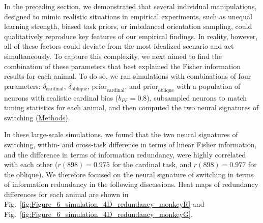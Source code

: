 \documentclass[lineno,pdflatex,sn-basic]{sn-jnl}%
\theoremstyle{thmstyleone}%
\theoremstyle{thmstyletwo}%
\theoremstyle{thmstylethree}%
\begin{document}

In the preceding section, we demonstrated that several individual manipulations, designed to mimic realistic situations in empirical experiments, such as unequal learning strength, biased task priors, or imbalanced orientation sampling, could qualitatively reproduce key features of our empirical findings. In reality, however, all of these factors could deviate from the most idealized scenario and act simultaneously. To capture this complexity, we next aimed to find the combination of these parameters that best explained the Fisher information results for each animal. To do so, we ran simulations with combinations of four parameters: $\delta_\textrm{cardinal}$, $\delta_\textrm{oblique}$, $\textrm{prior}_\textrm{cardinal}$, and $\textrm{prior}_\textrm{oblique}$ with a population of neurons with realistic cardinal bias ($b_{PF} = 0.8$), subsampled neurons to match tuning statistics for each animal, and then computed the two neural signatures of switching
(\hyperref[sec_ch2:nonideal_simulation_largescale]{Methods}). 

In these large-scale simulations, we found that the two neural signatures of switching, within- and cross-task difference in terms of linear Fisher information, and the difference in terms of information redundancy, were highly correlated with each other ($r(898) =  0.975$ for the cardinal task, and $r(898) =  0.977$ for the oblique). We therefore focused on the neural signature of switching in terms of information redundancy in the following discussions. Heat maps of redundancy differences for each animal are shown in Fig.~\ref{fig:Figure_6_simulation_4D_redundancy_monkeyR} and Fig.~\ref{fig:Figure_6_simulation_4D_redundancy_monkeyG}.
\end{document}
